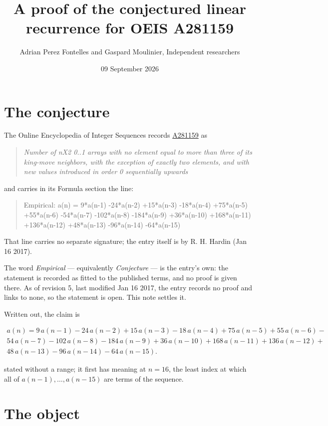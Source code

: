 \documentclass[11pt]{article}
\title{A proof of the conjectured linear recurrence for OEIS A281159}
\author{Adrian Perez Fontelles and Gaspard Moulinier, Independent researchers}
\date{09 September 2026}
\theoremstyle{definition}
\begin{document}
\maketitle
\section{The conjecture}

The Online Encyclopedia of Integer Sequences records \href{https://oeis.org/A281159}{A281159} as

\begin{quote}\itshape Number of nX2 0..1 arrays with no element equal to more than three of its king-move neighbors, with the exception of exactly two elements, and with new values introduced in order 0 sequentially upwards\end{quote}

and carries in its Formula section the line:

\begin{quote}\ttfamily Empirical: a(n) = 9*a(n-1) -24*a(n-2) +15*a(n-3) -18*a(n-4) +75*a(n-5) +55*a(n-6) -54*a(n-7) -102*a(n-8) -184*a(n-9) +36*a(n-10) +168*a(n-11) +136*a(n-12) +48*a(n-13) -96*a(n-14) -64*a(n-15)\end{quote}

That line carries no separate signature; the entry itself is by R. H. Hardin (Jan 16 2017).

The word {\itshape Empirical} --- equivalently {\itshape Conjecture} --- is the entry's own: the statement is recorded as fitted to the published terms, and no proof is given there. As of revision 5, last modified Jan 16 2017, the entry records no proof and links to none, so the statement is open. This note settles it.

Written out, the claim is

\begin{multline*} a(n) = 9\,a(n-1) - 24\,a(n-2) + 15\,a(n-3) - 18\,a(n-4) + 75\,a(n-5) + 55\,a(n-6) - \\ 54\,a(n-7) - 102\,a(n-8) - 184\,a(n-9) + 36\,a(n-10) + 168\,a(n-11) + 136\,a(n-12) + \\ 48\,a(n-13) - 96\,a(n-14) - 64\,a(n-15). \end{multline*}

stated without a range; it first has meaning at $n = 16$, the least index at which all of $a(n-1),\dots,a(n-15)$ are terms of the sequence.

\section{The object}
\end{document}

